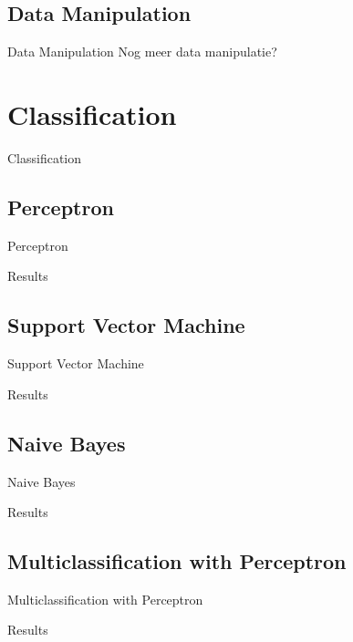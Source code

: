 \documentclass{beamer}
\begin{document}
\subsection{Data Manipulation}
\begin{frame}{Data Manipulation}
Nog meer data manipulatie?
\end{frame}

\section{Classification}
\begin{frame}{Classification}
\end{frame}

\subsection{Perceptron}
\begin{frame}{Perceptron}
\end{frame}
\begin{frame}{Results}
\end{frame}

\subsection{Support Vector Machine}
\begin{frame}{Support Vector Machine}
\end{frame}
\begin{frame}{Results}
\end{frame}

\subsection{Naive Bayes}
\begin{frame}{Naive Bayes}
\end{frame}
\begin{frame}{Results}
\end{frame}

\subsection{Multiclassification with Perceptron}
\begin{frame}{Multiclassification with Perceptron}
\end{frame}
\begin{frame}{Results}
\end{frame}
\end{document}
